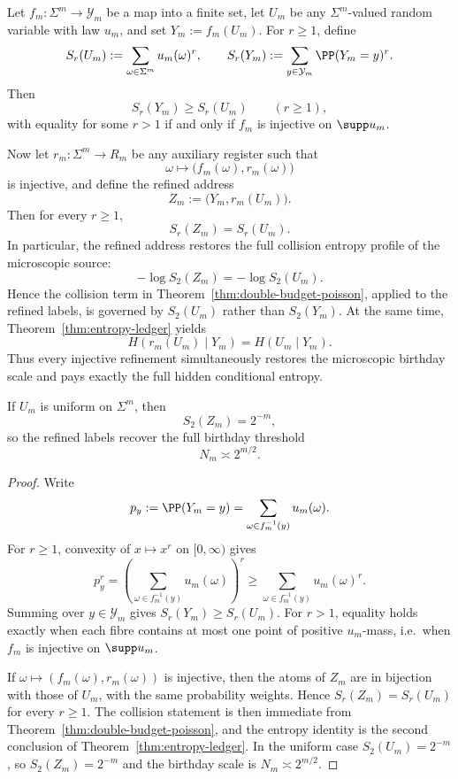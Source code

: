 \begin{theorem}
\label{thm:collision-profile-restoration}
Let \(f_m:\Sigma^m\to \mathcal{Y}_m\) be a map into a finite set, let
\(U_m\) be any \(\Sigma^m\)-valued random variable with law \(u_m\), and
set \(Y_m:=f_m(U_m)\).  For \(r\geq 1\), define
\[
  S_r(U_m):=\sum_{\omega\in\Sigma^m}u_m(\omega)^r,
  \qquad
  S_r(Y_m):=\sum_{y\in\mathcal{Y}_m}\PP(Y_m=y)^r.
\]
Then
\[
  S_r(Y_m)\geq S_r(U_m)
  \qquad (r\geq 1),
\]
with equality for some \(r>1\) if and only if \(f_m\) is injective on
\(\supp u_m\).

Now let \(r_m:\Sigma^m\to R_m\) be any auxiliary register such that
\[
  \omega\longmapsto \bigl(f_m(\omega),r_m(\omega)\bigr)
\]
is injective, and define the refined address
\[
  Z_m:=\bigl(Y_m,r_m(U_m)\bigr).
\]
Then for every \(r\geq 1\),
\[
  S_r(Z_m)=S_r(U_m).
\]
In particular, the refined address restores the full collision entropy
profile of the microscopic source:
\[
  -\log S_2(Z_m)=-\log S_2(U_m).
\]
Hence the collision term in
Theorem~\ref{thm:double-budget-poisson}, applied to the refined labels,
is governed by \(S_2(U_m)\) rather than \(S_2(Y_m)\).  At the same
time, Theorem~\ref{thm:entropy-ledger} yields
\[
  H(r_m(U_m)\mid Y_m)=H(U_m\mid Y_m).
\]
Thus every injective refinement simultaneously restores the microscopic
birthday scale and pays exactly the full hidden conditional entropy.

If \(U_m\) is uniform on \(\Sigma^m\), then
\[
  S_2(Z_m)=2^{-m},
\]
so the refined labels recover the full birthday threshold
\[
  N_m\asymp 2^{m/2}.
\]
\end{theorem}

\begin{proof}
Write
\[
  p_y:=\PP(Y_m=y)=\sum_{\omega\in f_m^{-1}(y)}u_m(\omega).
\]
For \(r\geq 1\), convexity of \(x\mapsto x^r\) on \([0,\infty)\) gives
\[
  p_y^r
  = \left(\sum_{\omega\in f_m^{-1}(y)}u_m(\omega)\right)^r
  \geq \sum_{\omega\in f_m^{-1}(y)}u_m(\omega)^r.
\]
Summing over \(y\in\mathcal Y_m\) gives \(S_r(Y_m)\geq S_r(U_m)\).  For
\(r>1\), equality holds exactly when each fibre contains at most one
point of positive \(u_m\)-mass, i.e.\ when \(f_m\) is injective on
\(\supp u_m\).

If \(\omega\mapsto(f_m(\omega),r_m(\omega))\) is injective, then the
atoms of \(Z_m\) are in bijection with those of \(U_m\), with the same
probability weights.  Hence \(S_r(Z_m)=S_r(U_m)\) for every \(r\geq 1\).
The collision statement is then immediate from
Theorem~\ref{thm:double-budget-poisson}, and the entropy identity is the
second conclusion of Theorem~\ref{thm:entropy-ledger}.  In the uniform
case \(S_2(U_m)=2^{-m}\), so \(S_2(Z_m)=2^{-m}\) and the birthday scale
is \(N_m\asymp 2^{m/2}\).
\end{proof}
